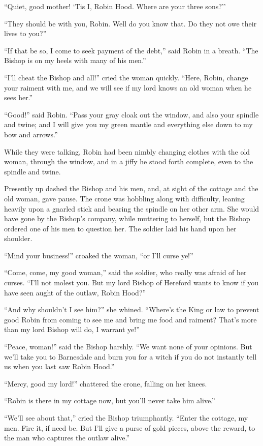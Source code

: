 ``Quiet, good mother! `Tis I, Robin Hood. Where are your three sons?''

``They should be with you, Robin. Well do you know that. Do they not owe
their lives to you?''

``If that be so, I come to seek payment of the debt,'' said Robin in a
breath. ``The Bishop is on my heels with many of his men.''

``I'll cheat the Bishop and all!'' cried the woman quickly. ``Here,
Robin, change your raiment with me, and we will see if my lord knows an
old woman when he sees her.''

``Good!'' said Robin. ``Pass your gray cloak out the window, and also
your spindle and twine; and I will give you my green mantle and
everything else down to my bow and arrows.''

While they were talking, Robin had been nimbly changing clothes with the
old woman, through the window, and in a jiffy he stood forth complete,
even to the spindle and twine.

Presently up dashed the Bishop and his men, and, at sight of the cottage
and the old woman, gave pause. The crone was hobbling along with
difficulty, leaning heavily upon a gnarled stick and bearing the spindle
on her other arm. She would have gone by the Bishop's company, while
muttering to herself, but the Bishop ordered one of his men to question
her. The soldier laid his hand upon her shoulder.

``Mind your business!'' croaked the woman, ``or I'll curse ye!''

``Come, come, my good woman,'' said the soldier, who really was afraid
of her curses. ``I'll not molest you. But my lord Bishop of Hereford
wants to know if you have seen aught of the outlaw, Robin Hood?''

``And why shouldn't I see him?'' she whined. ``Where's the King or law
to prevent good Robin from coming to see me and bring me food and
raiment? That's more than my lord Bishop will do, I warrant ye!''

``Peace, woman!'' said the Bishop harshly. ``We want none of your
opinions. But we'll take you to Barnesdale and burn you for a witch if
you do not instantly tell us when you last saw Robin Hood.''

``Mercy, good my lord!'' chattered the crone, falling on her knees.

``Robin is there in my cottage now, but you'll never take him alive.''

``We'll see about that,'' cried the Bishop triumphantly. ``Enter the
cottage, my men. Fire it, if need be. But I'll give a purse of gold
pieces, above the reward, to the man who captures the outlaw alive.''

